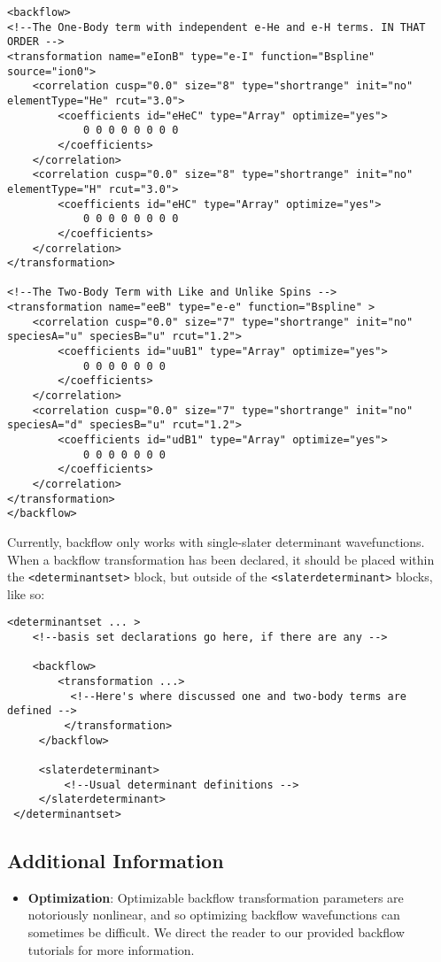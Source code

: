 \begin{lstlisting}
<backflow>
<!--The One-Body term with independent e-He and e-H terms. IN THAT ORDER -->
<transformation name="eIonB" type="e-I" function="Bspline" source="ion0">
    <correlation cusp="0.0" size="8" type="shortrange" init="no" elementType="He" rcut="3.0">
        <coefficients id="eHeC" type="Array" optimize="yes"> 
            0 0 0 0 0 0 0 0
        </coefficients>
    </correlation>
    <correlation cusp="0.0" size="8" type="shortrange" init="no" elementType="H" rcut="3.0">
        <coefficients id="eHC" type="Array" optimize="yes"> 
            0 0 0 0 0 0 0 0
        </coefficients>
    </correlation>
</transformation>

<!--The Two-Body Term with Like and Unlike Spins -->
<transformation name="eeB" type="e-e" function="Bspline" >
    <correlation cusp="0.0" size="7" type="shortrange" init="no" speciesA="u" speciesB="u" rcut="1.2">
        <coefficients id="uuB1" type="Array" optimize="yes"> 
            0 0 0 0 0 0 0
        </coefficients>
    </correlation>
    <correlation cusp="0.0" size="7" type="shortrange" init="no" speciesA="d" speciesB="u" rcut="1.2">
        <coefficients id="udB1" type="Array" optimize="yes"> 
            0 0 0 0 0 0 0
        </coefficients>
    </correlation>
</transformation>
</backflow>
\end{lstlisting}  

Currently, backflow only works with single-slater determinant wavefunctions.  When a backflow transformation has been declared, it should be placed within the \texttt{<determinantset>} block, but outside of the \texttt{<slaterdeterminant>} blocks, like so:

\begin{lstlisting}
<determinantset ... >
    <!--basis set declarations go here, if there are any -->
    
    <backflow>
        <transformation ...>
          <!--Here's where discussed one and two-body terms are defined -->
         </transformation>
     </backflow>
     
     <slaterdeterminant>
         <!--Usual determinant definitions -->
     </slaterdeterminant>
 </determinantset>
\end{lstlisting}

\subsection{Additional Information}
\begin{itemize}
\item \textbf{Optimization}:  Optimizable backflow transformation parameters are notoriously nonlinear, and so optimizing backflow wavefunctions can sometimes be difficult.   We direct the reader to our provided backflow tutorials for more information.  

\end{itemize}



